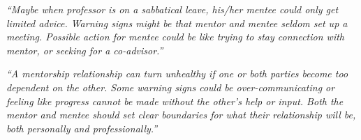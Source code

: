 \documentclass[12pt]{beamer}
\newcommand\ans[1]{{\it ``#1''}}
\newcommand\gap{\vspace{5mm}}
\begin{document}
\begin{frame}
  
\ans{Maybe when professor is on a sabbatical leave, his/her mentee could only get limited advice.   Warning  signs  might  be  that  mentor  and  mentee  seldom  set  up  a  meeting. Possible  action  for  mentee  could  be  like  trying  to  stay  connection  with  mentor,  or seeking for a co-advisor.}

\gap

\ans{A mentorship relationship can turn unhealthy if one or both parties become too dependent  on  the  other.   Some  warning  signs  could  be  over-communicating  or  feeling like progress cannot be made without the other’s help or input.  Both the mentor and mentee should set clear boundaries for what their relationship will be, both personally and professionally.}

  








\gap


\end{frame}
\end{document}
